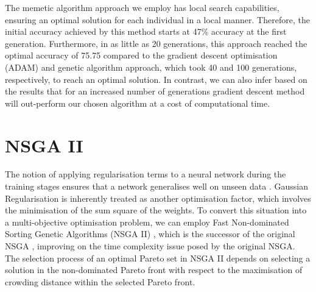 \documentclass[conference]{IEEEtran}
\begin{document}
\par
The memetic algorithm approach we employ has local search capabilities, ensuring an optimal solution for each individual in a local manner. Therefore, the initial accuracy achieved by this method starts at 47\% accuracy at the first generation. Furthermore, in as little as 20 generations, this approach reached the optimal accuracy of 75.75 compared to the gradient descent optimisation (ADAM) and genetic algorithm approach, which took 40 and 100 generations, respectively, to reach an optimal solution. In contrast, we can also infer based on the results that for an increased number of generations gradient descent method will out-perform our chosen algorithm at a cost of computational time. 

\section{NSGA II}

The notion of applying regularisation terms to a neural network during the training stages ensures that a network generalises well on unseen data \cite{regularization}. Gaussian Regularisation is inherently treated as another optimisation factor, which involves the minimisation of the sum square of the weights. To convert this situation into a multi-objective optimisation problem, we can employ Fast Non-dominated Sorting Genetic Algorithms (NSGA II) \cite{NSGA2}, which is the successor of the original NSGA \cite{NSGA}, improving on the time complexity issue posed by the original NSGA. The selection process of an optimal Pareto set in NSGA II depends on selecting a solution in the non-dominated Pareto front with respect to the maximisation of crowding distance within the selected Pareto front.
\end{document}
